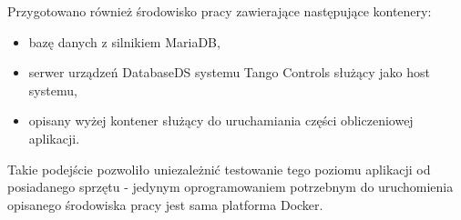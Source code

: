 Przygotowano również środowisko pracy zawierające następujące kontenery:
\begin{itemize}
    \item bazę danych z silnikiem MariaDB,
    \item serwer urządzeń DatabaseDS systemu Tango Controls służący jako host systemu,
    \item opisany wyżej kontener służący do uruchamiania części obliczeniowej aplikacji.
\end{itemize}

Takie podejście pozwoliło uniezależnić testowanie tego poziomu aplikacji od posiadanego sprzętu - jedynym oprogramowaniem potrzebnym do uruchomienia opisanego środowiska pracy jest sama platforma Docker.
